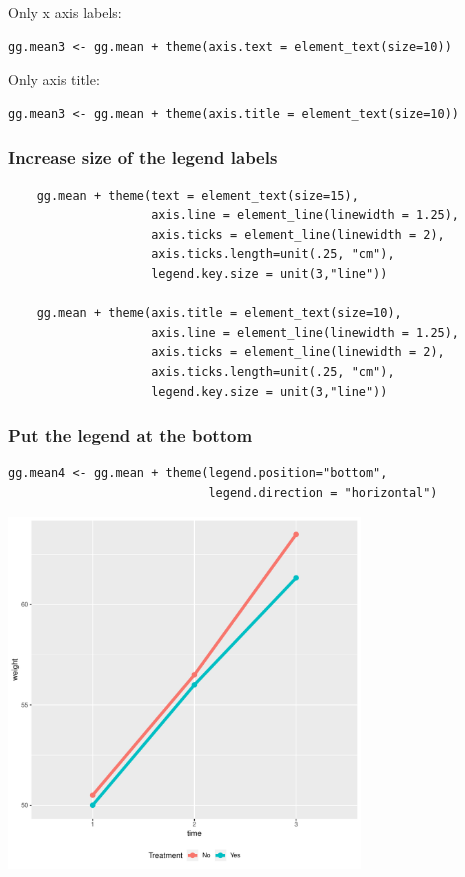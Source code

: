 \documentclass{article}
\begin{document}
Only x axis labels:
\lstset{language=r,label= ,caption= ,captionpos=b,numbers=none}
\begin{lstlisting}
gg.mean3 <- gg.mean + theme(axis.text = element_text(size=10))
\end{lstlisting}

Only axis title:
\lstset{language=r,label= ,caption= ,captionpos=b,numbers=none}
\begin{lstlisting}
gg.mean3 <- gg.mean + theme(axis.title = element_text(size=10))
\end{lstlisting}

\clearpage
\subsubsection{Increase size of the legend labels}
\label{sec:org804e143}
\lstset{language=r,label= ,caption= ,captionpos=b,numbers=none}
\begin{lstlisting}
    gg.mean + theme(text = element_text(size=15), 
                    axis.line = element_line(linewidth = 1.25),
                    axis.ticks = element_line(linewidth = 2),
                    axis.ticks.length=unit(.25, "cm"),
                    legend.key.size = unit(3,"line"))

    gg.mean + theme(axis.title = element_text(size=10), 
                    axis.line = element_line(linewidth = 1.25),
                    axis.ticks = element_line(linewidth = 2),
                    axis.ticks.length=unit(.25, "cm"),
                    legend.key.size = unit(3,"line"))
\end{lstlisting}

\subsubsection{Put the legend at the bottom}
\label{sec:orgee6a2da}
\lstset{language=r,label= ,caption= ,captionpos=b,numbers=none}
\begin{lstlisting}
gg.mean4 <- gg.mean + theme(legend.position="bottom",
                            legend.direction = "horizontal")
\end{lstlisting}

\begin{center}
\includegraphics[trim={0 0 0 0},width=0.7\textwidth]{./figures/fig-meanTime4.pdf}
\end{center}
\clearpage
\end{document}
